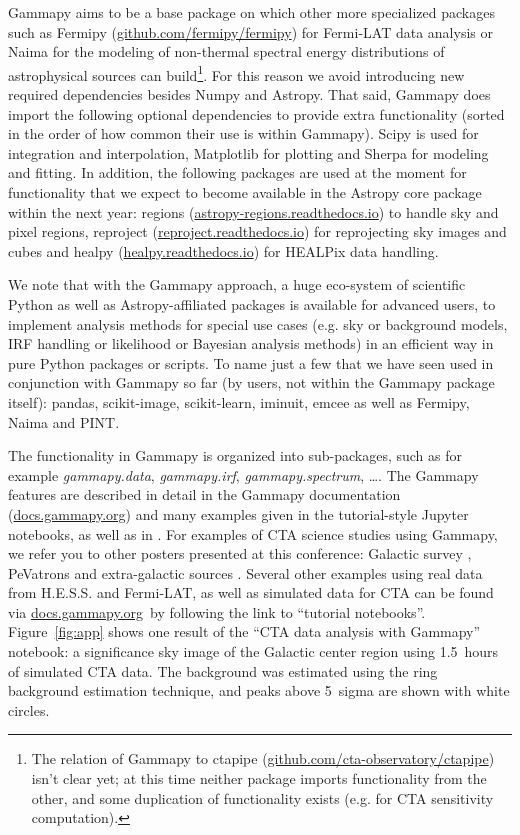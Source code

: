 \documentclass{PoS}
\newcommand{\urlCtaPipe}{\href{https://github.com/cta-observatory/ctapipe}{github.com/cta-observatory/ctapipe}}
\newcommand{\urlFermipy}{\href{https://github.com/fermipy/fermipy}{github.com/fermipy/fermipy}}
\newcommand{\urlGammapyDocs}{\href{http://docs.gammapy.org}{docs.gammapy.org}}
\newcommand{\urlHealpy}{\href{https://healpy.readthedocs.io}{healpy.readthedocs.io}}
\newcommand{\urlRegions}{\href{https://astropy-regions.readthedocs.io}{astropy-regions.readthedocs.io}}
\newcommand{\urlReproject}{\href{https://reproject.readthedocs.io}{reproject.readthedocs.io}}
\begin{document}
Gammapy aims to be a base package on which other more specialized packages such
as Fermipy (\urlFermipy) for Fermi-LAT data analysis or Naima \cite{naima} for
the modeling of non-thermal spectral energy distributions of astrophysical
sources can build\footnote{The relation of Gammapy to ctapipe (\urlCtaPipe)
isn't clear yet; at this time neither package imports functionality from the
other, and some duplication of functionality exists (e.g. for CTA sensitivity
computation).}. For this reason we avoid introducing new required dependencies
besides Numpy and Astropy. That said, Gammapy does import the following optional
dependencies to provide extra functionality (sorted in the order of how common
their use is within Gammapy). Scipy \cite{scipy} is used for integration and
interpolation, Matplotlib \cite{matplotlib} for plotting and Sherpa
\cite{sherpa2001, sherpa2009, sherpa2011} for modeling and fitting. In addition,
the following packages are used at the moment for functionality that we expect
to become available in the Astropy core package within the next year: regions
(\urlRegions) to handle sky and pixel regions, reproject (\urlReproject) for
reprojecting sky images and cubes and healpy (\urlHealpy) for HEALPix data
handling. 

We note that with the Gammapy approach, a huge eco-system of scientific Python
as well as Astropy-affiliated packages is available for advanced users, to
implement analysis methods for special use cases (e.g. sky or background models,
IRF handling or likelihood or Bayesian analysis methods) in an efficient way in
pure Python packages or scripts. To name just a few that we have seen used in
conjunction with Gammapy so far (by users, not within the Gammapy package
itself): pandas, scikit-image, scikit-learn, iminuit, emcee as well as Fermipy,
Naima and PINT.

The functionality in Gammapy is organized into sub-packages, such as for example
{\it gammapy.data}, {\it gammapy.irf}, {\it gammapy.spectrum}, \ldots . The
Gammapy features are described in detail in the Gammapy documentation
(\urlGammapyDocs) and many examples given in the tutorial-style Jupyter
notebooks, as well as in \cite{gammapy-icrc2015}. For examples of CTA science
studies using Gammapy, we refer you to other posters presented at this
conference: Galactic survey \cite{roberta}, PeVatrons \cite{cyril} and
extra-galactic sources \cite{julien}. Several other examples using real data
from H.E.S.S. and Fermi-LAT, as well as simulated data for CTA can be found via
\urlGammapyDocs\ by following the link to ``tutorial notebooks''.
Figure~\ref{fig:app} shows one result of the ``CTA data analysis with Gammapy''
notebook: a significance sky image of the Galactic center region using 1.5~hours
of simulated CTA data. The background was estimated using the ring background
estimation technique, and peaks above 5~sigma are shown with white circles.
\end{document}
